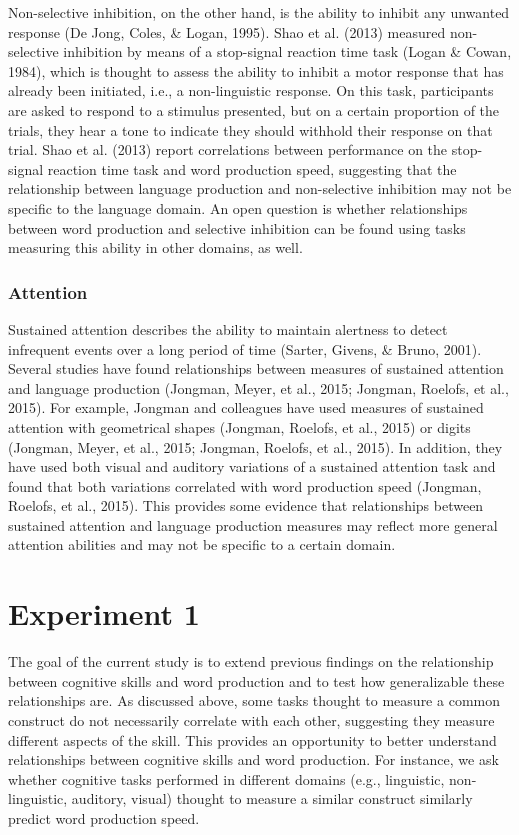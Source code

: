 \documentclass[
  man,floatsintext]{apa6}
\begin{document}
Non-selective inhibition, on the other hand, is the ability to inhibit any unwanted response (De Jong, Coles, \& Logan, 1995). Shao et al. (2013) measured non-selective inhibition by means of a stop-signal reaction time task (Logan \& Cowan, 1984), which is thought to assess the ability to inhibit a motor response that has already been initiated, i.e., a non-linguistic response. On this task, participants are asked to respond to a stimulus presented, but on a certain proportion of the trials, they hear a tone to indicate they should withhold their response on that trial. Shao et al. (2013) report correlations between performance on the stop-signal reaction time task and word production speed, suggesting that the relationship between language production and non-selective inhibition may not be specific to the language domain. An open question is whether relationships between word production and selective inhibition can be found using tasks measuring this ability in other domains, as well.

\hypertarget{attention}{%
\subsubsection{Attention}\label{attention}}

Sustained attention describes the ability to maintain alertness to detect infrequent events over a long period of time (Sarter, Givens, \& Bruno, 2001). Several studies have found relationships between measures of sustained attention and language production (Jongman, Meyer, et al., 2015; Jongman, Roelofs, et al., 2015). For example, Jongman and colleagues have used measures of sustained attention with geometrical shapes (Jongman, Roelofs, et al., 2015) or digits (Jongman, Meyer, et al., 2015; Jongman, Roelofs, et al., 2015). In addition, they have used both visual and auditory variations of a sustained attention task and found that both variations correlated with word production speed (Jongman, Roelofs, et al., 2015). This provides some evidence that relationships between sustained attention and language production measures may reflect more general attention abilities and may not be specific to a certain domain.

\hypertarget{experiment-1}{%
\section{Experiment 1}\label{experiment-1}}

The goal of the current study is to extend previous findings on the relationship between cognitive skills and word production and to test how generalizable these relationships are. As discussed above, some tasks thought to measure a common construct do not necessarily correlate with each other, suggesting they measure different aspects of the skill. This provides an opportunity to better understand relationships between cognitive skills and word production. For instance, we ask whether cognitive tasks performed in different domains (e.g., linguistic, non-linguistic, auditory, visual) thought to measure a similar construct similarly predict word production speed.
\end{document}
